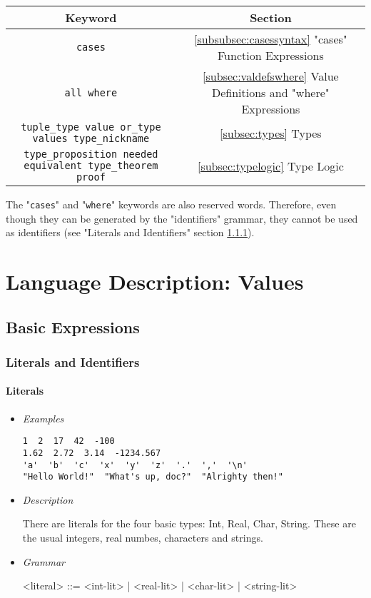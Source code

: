 \documentclass{article}
\begin{document}
\begin{center}
\begin{tabular}{ |c|c| } 
\hline
Keyword & Section \\ 
\hline
\hline
\texttt{cases} & \ref{subsubsec:casessyntax} "cases" Function Expressions \\
\hline
\texttt{all where} & \ref{subsec:valdefswhere}
Value Definitions and "where" Expressions \\
\hline
\texttt{tuple_type value or_type values type_nickname} &
\ref{subsec:types} Types \\
\hline
\texttt{type_proposition needed equivalent type_theorem proof} &
{\ref{subsec:typelogic} Type Logic} \\
\hline
\end{tabular}
\end{center}
The "\texttt{cases}" and "\texttt{where}" keywords are also
reserved words. Therefore, even though they can be generated by the
"identifiers" grammar, they cannot be used as identifiers (see "Literals and
Identifiers" section \ref{subsubsec:litsandidents}).

\newpage
\section{Language Description: Values}

\subsection{Basic Expressions}

\subsubsection{Literals and Identifiers}
\label{subsubsec:litsandidents}

\paragraph{Literals}
\begin{itemize}

\item \textit{Examples}
\begin{verbatim}
1  2  17  42  -100
1.62  2.72  3.14  -1234.567
'a'  'b'  'c'  'x'  'y'  'z'  '.'  ','  '\n'
"Hello World!"  "What's up, doc?"  "Alrighty then!"
\end{verbatim}

\item \textit{Description}

There are literals for the four basic types: Int, Real, Char, String. These are the 
usual integers, real numbes, characters and strings.

\item \textit{Grammar}
\begin{grammar}
<literal> ::= <int-lit> | <real-lit> | <char-lit> | <string-lit>
\end{grammar}

\end{itemize}
\end{document}
